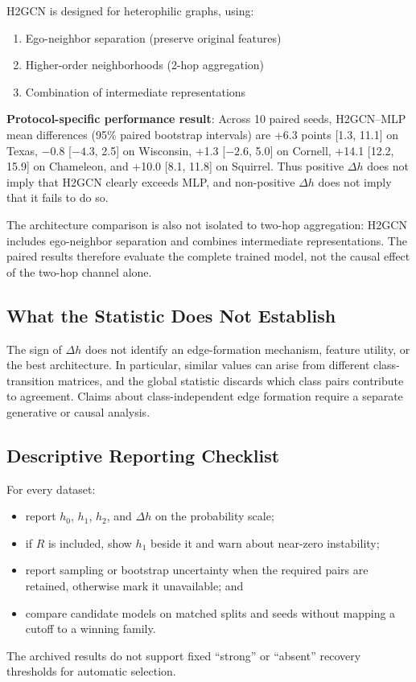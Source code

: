 H2GCN \cite{zhu2020beyond} is designed for heterophilic graphs, using:
\begin{enumerate}
    \item Ego-neighbor separation (preserve original features)
    \item Higher-order neighborhoods (2-hop aggregation)
    \item Combination of intermediate representations
\end{enumerate}

\textbf{Protocol-specific performance result}: Across 10 paired seeds, H2GCN--MLP mean differences (95\% paired bootstrap intervals) are +6.3 points [1.3, 11.1] on Texas, $-0.8$ [$-4.3$, 2.5] on Wisconsin, +1.3 [$-2.6$, 5.0] on Cornell, +14.1 [12.2, 15.9] on Chameleon, and +10.0 [8.1, 11.8] on Squirrel. Thus positive $\Delta h$ does not imply that H2GCN clearly exceeds MLP, and non-positive $\Delta h$ does not imply that it fails to do so.

The architecture comparison is also not isolated to two-hop aggregation: H2GCN includes ego-neighbor separation and combines intermediate representations. The paired results therefore evaluate the complete trained model, not the causal effect of the two-hop channel alone.

\subsection{What the Statistic Does Not Establish}

The sign of $\Delta h$ does not identify an edge-formation mechanism, feature utility, or the best architecture. In particular, similar values can arise from different class-transition matrices, and the global statistic discards which class pairs contribute to agreement. Claims about class-independent edge formation require a separate generative or causal analysis.

\subsection{Descriptive Reporting Checklist}

\begin{tcolorbox}[colback=green!5!white,colframe=green!75!black,title=Two-Hop Diagnostic Report]
For every dataset:
\begin{itemize}
    \item report $h_0$, $h_1$, $h_2$, and $\Delta h$ on the probability scale;
    \item if $R$ is included, show $h_1$ beside it and warn about near-zero instability;
    \item report sampling or bootstrap uncertainty when the required pairs are retained, otherwise mark it unavailable; and
    \item compare candidate models on matched splits and seeds without mapping a cutoff to a winning family.
\end{itemize}
\end{tcolorbox}

The archived results do not support fixed ``strong'' or ``absent'' recovery thresholds for automatic selection.
